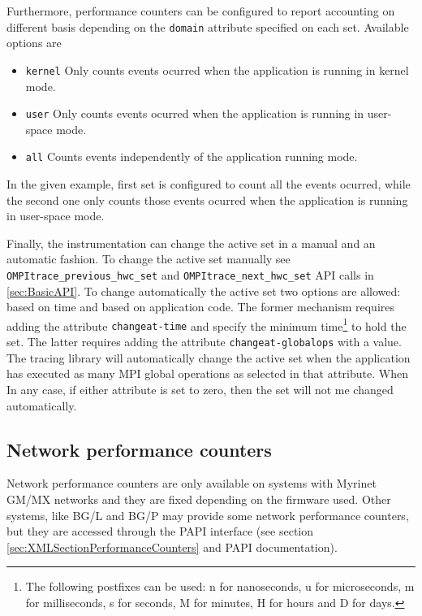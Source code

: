 Furthermore, performance counters can be configured to report accounting on different basis depending on the {\tt domain} attribute specified on each set. Available options are
\begin{itemize}
 \item {\tt kernel} Only counts events ocurred when the application is running in kernel mode.
 \item {\tt user} Only counts events ocurred when the application is running in user-space mode.
 \item {\tt all} Counts events independently of the application running mode.
\end{itemize}

In the given example, first set is configured to count all the events ocurred, while the second one only counts those events ocurred when the application is running in user-space mode.

Finally, the instrumentation can change the active set in a manual and an automatic fashion. To change the active set manually see {\tt OMPItrace\_previous\_hwc\_set} and {\tt OMPItrace\_next\_hwc\_set} API calls in \ref{sec:BasicAPI}. To change automatically the active set two options are allowed: based on time and based on application code. The former mechanism requires adding the attribute {\tt changeat-time} and specify the minimum time\footnote{The following postfixes can be used: n for nanoseconds, u for microseconds, m for milliseconds, s for seconds, M for minutes, H for hours and D for days.} to hold the set. The latter requires adding the attribute {\tt changeat-globalops} with a value. The tracing library will automatically change the active set when the application has executed as many MPI global operations as selected in that attribute. When In any case, if either attribute is set to zero, then the set will not me changed automatically.

\subsection{Network performance counters}\label{subsec:NetworkPerformanceCounters}

Network performance counters are only available on systems with Myrinet GM/MX networks and they are fixed depending on the firmware used. Other systems, like BG/L and BG/P may provide some network performance counters, but they are accessed through the PAPI interface (see section \ref{sec:XMLSectionPerformanceCounters} and {PAPI} documentation).

